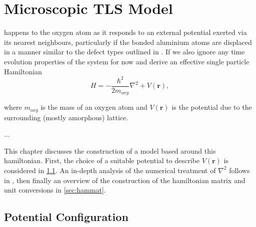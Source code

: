 \chapter{Microscopic TLS Model}\label{ch:tls}

 happens to the oxygen atom as it responds to an external potential exerted via its nearest neighbours, particularly if the bonded aluminium atoms are displaced in a manner similar to the defect types outlined in .
If we also ignore any time evolution properties of the system for now and derive an effective single particle Hamiltonian
\begin{equation}
    H = -\frac{\hbar^2}{2m_{oxy}}\nabla^2+V(\mathbf{r}),
    \label{eq:OHam}
\end{equation}

where $m_{oxy}$ is the mass of an oxygen atom and $V(\mathbf{r})$ is the potential due to the surrounding (mostly amorphous) lattice.

...

This chapter discusses the construction of a model based around this hamiltonian.
First, the choice of a suitable potential to describe $V(\mathbf{r})$ is considered in \cref{sec:potential}.
An in-depth analysis of the numerical treatment of $\nabla^2$ follows in , then finally an overview of the construction of the hamiltonian matrix and unit conversions in \cref{sec:hammat}.

\section{Potential Configuration}\label{sec:potential}

